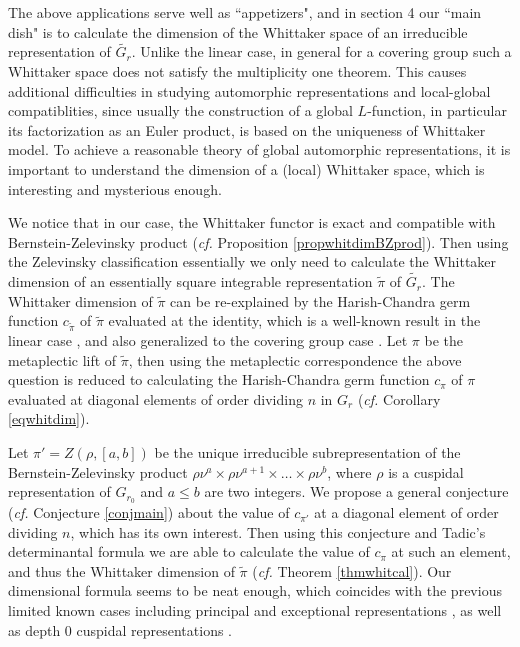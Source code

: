 \documentclass{amsart}
\numberwithin{equation}{section}
\newcommand{\wt}[1]{\widetilde{#1}}
\begin{document}
	The above applications serve well as ``appetizers", and in section 4 our ``main dish" is to calculate the dimension of the Whittaker space of an irreducible representation of $\wt{G_{r}}$. Unlike the linear case, in general for a covering group such a Whittaker space does not satisfy the multiplicity one theorem. This causes additional difficulties in studying automorphic representations and local-global compatiblities, since usually the construction of a global $L$-function, in particular its factorization as an Euler product, is based on the uniqueness of Whittaker model. To achieve a reasonable theory of global automorphic representations, it is important to understand the dimension of a (local) Whittaker space, which is interesting and mysterious enough.
	
	We notice that in our case, the Whittaker functor is exact and compatible with Bernstein-Zelevinsky product (\emph{cf.} Proposition \ref{propwhitdimBZprod}). Then using the Zelevinsky classification essentially we only need to calculate the Whittaker dimension of an essentially square integrable representation $\wt{\pi}$ of $\wt{G_{r}}$. The Whittaker dimension of $\wt{\pi}$ can be re-explained by the Harish-Chandra germ function $c_{\wt{\pi}}$ of $\wt{\pi}$ evaluated at the identity, which is a well-known result in the linear case \cite{rodier1975modele}, \cite{moeglin1987modeles} and also generalized to the covering group case \cite{patel2014theorem}. Let $\pi$ be the metaplectic lift of $\wt{\pi}$, then using the metaplectic correspondence the above question is reduced to calculating the Harish-Chandra germ function $c_{\pi}$ of $\pi$ evaluated at diagonal elements of order dividing $n$ in $G_{r}$ (\emph{cf.} Corollary \ref{eqwhitdim}). 
	
	Let $\pi'=Z(\rho,[a,b])$ be the unique irreducible subrepresentation of the Bernstein-Zelevinsky product $\rho\nu^{a}\times\rho\nu^{a+1}\times\dots\times\rho\nu^{b}$, where $\rho$ is a cuspidal representation of $G_{r_{0}}$ and $a\leq b$ are two integers. We propose a general conjecture (\emph{cf.} Conjecture \ref{conjmain}) about the value of $c_{\pi'}$ at a diagonal element of order dividing $n$, which has its own interest. Then using this conjecture and Tadic's determinantal formula we are able to calculate the value of $c_{\pi}$ at such an element, and thus the Whittaker dimension of $\wt{\pi}$ (\emph{cf.} Theorem \ref{thmwhitcal}). Our dimensional formula seems to be neat enough, which coincides with the previous limited known cases including principal and exceptional representations \cite{kazhdan1984metaplectic}, as well as depth 0 cuspidal representations \cite{blondel1992uniqueness}.
	
\end{document}

